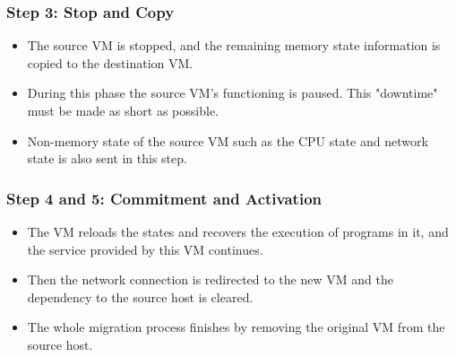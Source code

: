 \documentclass{article}
\begin{document}
\subsubsection{Step 3: Stop and Copy}
\begin{itemize}
    \item The source VM is stopped, and the remaining memory state information is copied to the destination VM. 
    
    \item During this phase the source VM's functioning is paused. This "downtime" must be made as short as possible. 
    
    \item Non-memory state of the source VM such as the CPU state and network state is also sent in this step.
\end{itemize}

\subsubsection{Step 4 and 5: Commitment and Activation}
\begin{itemize}
    \item The VM reloads the states and recovers the execution of programs in it, and the service provided by this VM continues.
    
    \item Then the network connection is redirected to the new VM and the dependency to the source host is cleared. 
    
    \item The whole migration process finishes by removing the original VM from the source host.
\end{itemize}
\end{document}
